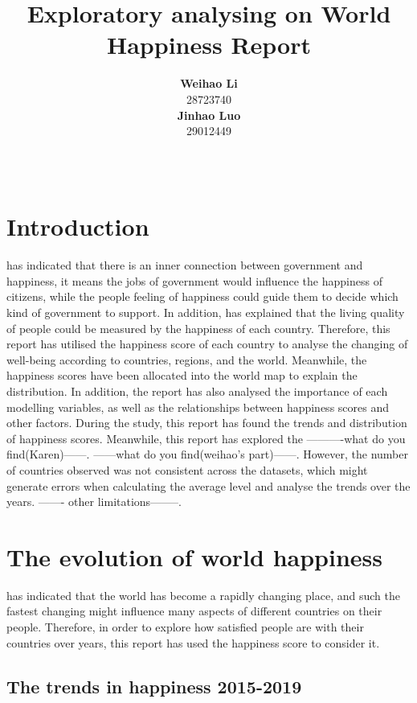 \documentclass[11pt,a4paper,]{article}
\title{Exploratory analysing on World Happiness Report}
\author{\sf\Large\textbf{ Weihao Li}\\ {\sf\large 28723740\\[0.5cm]} \sf\Large\textbf{ Jinhao Luo}\\ {\sf\large 29012449\\[0.5cm]}}
\date{\sf\Date~\Month~\Year}
\makeatletter
\def\titlepage{\front{\expandafter{\@title}}{\@author}{\@organization}}
\makeatother
\begin{document}
\titlepage

\hypertarget{introduction}{%
\section{Introduction}\label{introduction}}

\textcite{helliwell2019world} has indicated that there is an inner connection between government and happiness, it means the jobs of government would influence the happiness of citizens, while the people feeling of happiness could guide them to decide which kind of government to support. In addition, \textcite{helliwell2019world} has explained that the living quality of people could be measured by the happiness of each country. Therefore, this report has utilised the happiness score of each country to analyse the changing of well-being according to countries, regions, and the world. Meanwhile, the happiness scores have been allocated into the world map to explain the distribution. In addition, the report has also analysed the importance of each modelling variables, as well as the relationships between happiness scores and other factors. During the study, this report has found the trends and distribution of happiness scores. Meanwhile, this report has explored the ----------what do you find(Karen)------. ------what do you find(weihao's part)------. However, the number of countries observed was not consistent across the datasets, which might generate errors when calculating the average level and analyse the trends over the years. ------- other limitations--------.

\hypertarget{the-evolution-of-world-happiness}{%
\section{The evolution of world happiness}\label{the-evolution-of-world-happiness}}

\textcite{helliwell2019world} has indicated that the world has become a rapidly changing place, and such the fastest changing might influence many aspects of different countries on their people. Therefore, in order to explore how satisfied people are with their countries over years, this report has used the happiness score to consider it.

\hypertarget{the-trends-in-happiness-2015-2019}{%
\subsection{The trends in happiness 2015-2019}\label{the-trends-in-happiness-2015-2019}}
\end{document}

